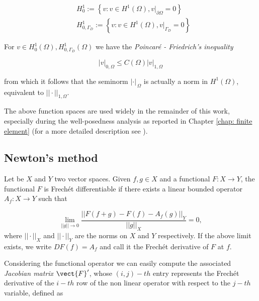 \begin{align}
& H^1_0 :=  \left\{   v : v \in H^1(\Omega), v|_{\partial \Omega} = 0\right\} \label{space: h1 zero} \\
& H^1_{0,\Gamma_D} :=  \left\{   v : v \in H^1(\Omega), v|_{\Gamma_D} = 0\right\} \label{space: h1 zero gamma}
\end{align} 

For $v \in H^1_0(\Omega),H^1_{0,\Gamma_D}(\Omega)$ we have the \textit{Poincar\'e - Friedrich's inequality} \cite{salsa:EDP}

\begin{equation}
\label{eq: poincarre inequality}
|v|_{0,\Omega} \leq C(\Omega) |v|_{1,\Omega}
\end{equation}

from which it follows that the seminorm $|\cdot |_{\,\Omega}$ is actually a norm in $H^1(\Omega)$, equivalent to $||\cdot ||_{1,\Omega}$.

The above function spaces are used widely in the remainder of this work, especially during the well-posedness analysis as reported in Chapter \ref{chap: finite element} (for a more detailed description see \cite{Adams:SobolevSpaces}).


\subsection{Newton's method}

\begin{Definizione}
Let be $X$ and $Y$ two vector spaces. Given $f,g \in X$ and a functional $F:X\rightarrow Y$, the functional $F$ is Frech\'et differentiable if there exists a linear bounded operator $A_f:X\rightarrow Y$ such that

\begin{equation}
\lim_{||g||\to 0}\dfrac{||F(f+g)-F(f)-A_f(g)||_Y}{||g||_X} = 0 ,
\end{equation}
where $||\cdot ||_X$ and $||\cdot ||_Y$ are the norms on $X$ and $Y$ respectively.
If the above limit exists, we write $DF(f)=A_f$ and call it the Frech\'et derivative of $F$ at $f$.
\end{Definizione}


Considering the functional operator  we can easily compute the associated \textit{Jacobian matrix} $\vect{F}'$, whose $(i,j)-th$ entry represents the Frech\'et derivative of the $i-th$ row of the non linear operator with respect to the $j-th$ variable, defined as

